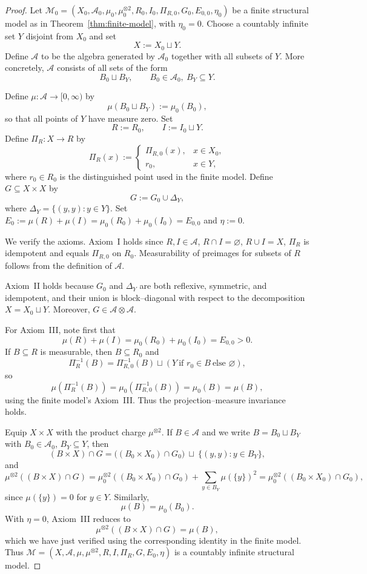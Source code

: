 \documentclass[11pt]{article}
\numberwithin{equation}{section}
\theoremstyle{definition}
\begin{document}
\begin{proof}
Let $\mathcal M_0=(X_0,\mathcal A_0,\mu_0,\mu_0^{\otimes2},R_0,I_0,\Pi_{R,0},G_0,E_{0,0},\eta_0)$
be a finite structural model as in Theorem~\ref{thm:finite-model}, with $\eta_0=0$.
Choose a countably infinite set $Y$ disjoint from $X_0$ and set
\[
X := X_0 \sqcup Y.
\]
Define $\mathcal A$ to be the algebra generated by $\mathcal A_0$ together with all subsets of $Y$.
More concretely, $\mathcal A$ consists of all sets of the form
\[
B_0 \sqcup B_Y,\qquad B_0\in\mathcal A_0,\ B_Y\subseteq Y.
\]

Define $\mu:\mathcal A\to[0,\infty)$ by
\[
\mu(B_0\sqcup B_Y) := \mu_0(B_0),
\]
so that all points of $Y$ have measure zero.
Set
\[
R := R_0,\qquad
I := I_0 \sqcup Y.
\]
Define $\Pi_R:X\to R$ by
\[
\Pi_R(x) :=
\begin{cases}
\Pi_{R,0}(x), & x\in X_0,\\
r_0, & x\in Y,
\end{cases}
\]
where $r_0\in R_0$ is the distinguished point used in the finite model.
Define $G\subseteq X\times X$ by
\[
G := G_0 \cup \Delta_Y,
\]
where $\Delta_Y=\{(y,y):y\in Y\}$.
Set $E_0 := \mu(R)+\mu(I) = \mu_0(R_0)+\mu_0(I_0) = E_{0,0}$ and $\eta := 0$.

We verify the axioms.
Axiom~I holds since $R,I\in\mathcal A$, $R\cap I=\varnothing$, $R\cup I=X$,
$\Pi_R$ is idempotent and equals $\Pi_{R,0}$ on $R_0$.
Measurability of preimages for subsets of $R$ follows from the definition of $\mathcal A$.

Axiom~II holds because $G_0$ and $\Delta_Y$ are both reflexive, symmetric, and idempotent,
and their union is block--diagonal with respect to the decomposition $X=X_0\sqcup Y$.
Moreover, $G\in\mathcal A\otimes\mathcal A$.

For Axiom~III, note first that
\[
\mu(R)+\mu(I) = \mu_0(R_0)+\mu_0(I_0) = E_{0,0} > 0.
\]
If $B\subseteq R$ is measurable, then $B\subseteq R_0$ and
\[
\Pi_R^{-1}(B) = \Pi_{R,0}^{-1}(B) \sqcup (Y\ \text{if } r_0\in B\ \text{else }\varnothing),
\]
so
\[
\mu(\Pi_R^{-1}(B))
= \mu_0(\Pi_{R,0}^{-1}(B)) = \mu_0(B) = \mu(B),
\]
using the finite model's Axiom~III.
Thus the projection--measure invariance holds.

Equip $X\times X$ with the product charge $\mu^{\otimes2}$.
If $B\in\mathcal A$ and we write $B=B_0\sqcup B_Y$ with
$B_0\in\mathcal A_0$, $B_Y\subseteq Y$, then
\[
(B\times X)\cap G
= \bigl( (B_0\times X_0)\cap G_0 \bigr)
  \ \sqcup\ \{(y,y):y\in B_Y\},
\]
and
\[
\mu^{\otimes2}((B\times X)\cap G)
= \mu_0^{\otimes2}((B_0\times X_0)\cap G_0)
  + \sum_{y\in B_Y} \mu(\{y\})^2
= \mu_0^{\otimes2}((B_0\times X_0)\cap G_0),
\]
since $\mu(\{y\})=0$ for $y\in Y$.
Similarly,
\[
\mu(B) = \mu_0(B_0).
\]
With $\eta=0$, Axiom~III reduces to
\[
\mu^{\otimes2}((B\times X)\cap G) = \mu(B),
\]
which we have just verified using the corresponding identity in the finite model.
Thus $\mathcal M=(X,\mathcal A,\mu,\mu^{\otimes2},R,I,\Pi_R,G,E_0,\eta)$ is a countably infinite structural model.
\end{proof}
\end{document}
